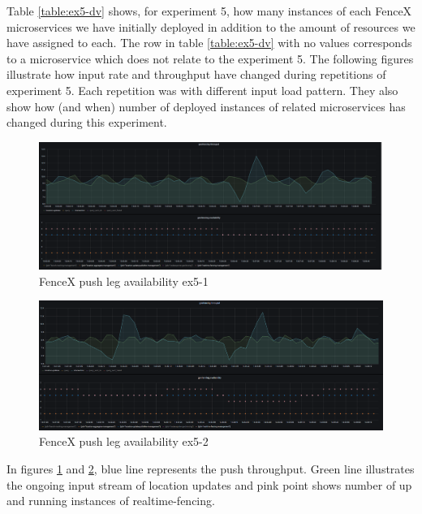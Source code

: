 \documentclass[a4]{report}
\begin{document}
    Table \ref{table:ex5-dv} shows, for experiment 5, how many instances of each FenceX microservices we have initially
    deployed in addition to the amount of resources we have assigned to each.
    The row in table \ref{table:ex5-dv} with no values corresponds to a microservice which does not relate to the
    experiment 5.
    The following figures illustrate how input rate and throughput have changed during repetitions of experiment 5.
    Each repetition was with different input load pattern.
    They also show how (and when) number of deployed instances of related microservices has changed during this
    experiment.

    \begin{figure}[h!]
        \centering
        \caption{FenceX push leg availability ex5-1}
        \label{fig:ex5-1}
        \includegraphics[width=\linewidth, scale=0.4]{images/evaluation/ex5-benchmarking-ongoing-2per6sec.png}
    \end{figure}

    \begin{figure}[h!]
        \centering
        \caption{FenceX push leg availability ex5-2}
        \label{fig:ex5-2}
        \includegraphics[width=\linewidth, scale=2]{images/evaluation/ex5-benchmarking-ongoing-2per7sec.png}
    \end{figure}

    In figures \ref{fig:ex5-1} and \ref{fig:ex5-2}, blue line represents the push throughput.
    Green line illustrates the ongoing input stream of location updates and pink point shows
    number of up and running instances of realtime-fencing.
\end{document}
